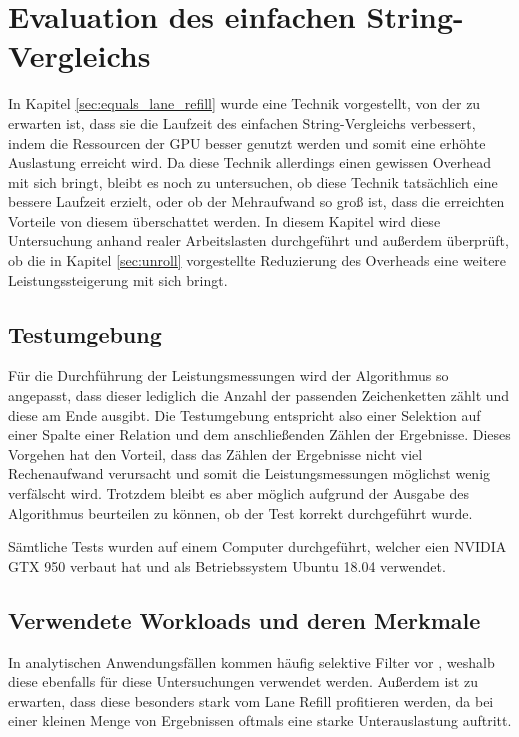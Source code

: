 \chapter{Evaluation des einfachen String-Vergleichs}
\label{sec:equals_evaluation}

In Kapitel \ref{sec:equals_lane_refill} wurde eine Technik vorgestellt, von der zu erwarten ist, dass sie die Laufzeit des einfachen String-Vergleichs verbessert, indem die Ressourcen der GPU besser genutzt werden und somit eine erhöhte Auslastung erreicht wird.
Da diese Technik allerdings einen gewissen Overhead mit sich bringt, bleibt es noch zu untersuchen, ob diese Technik tatsächlich eine bessere Laufzeit erzielt, oder ob der Mehraufwand so groß ist, dass die erreichten Vorteile von diesem überschattet werden.
In diesem Kapitel wird diese Untersuchung anhand realer Arbeitslasten durchgeführt und außerdem überprüft, ob die in Kapitel \ref{sec:unroll} vorgestellte Reduzierung des Overheads eine weitere Leistungssteigerung mit sich bringt.

\section{Testumgebung}

Für die Durchführung der Leistungsmessungen wird der Algorithmus so angepasst, dass dieser lediglich die Anzahl der passenden Zeichenketten zählt und diese am Ende ausgibt.
Die Testumgebung entspricht also einer Selektion auf einer Spalte einer Relation und dem anschließenden Zählen der Ergebnisse.
Dieses Vorgehen hat den Vorteil, dass das Zählen der Ergebnisse nicht viel Rechenaufwand verursacht und somit die Leistungsmessungen möglichst wenig verfälscht wird.
Trotzdem bleibt es aber möglich aufgrund der Ausgabe des Algorithmus beurteilen zu können, ob der Test korrekt durchgeführt wurde.

Sämtliche Tests wurden auf einem Computer durchgeführt, welcher eien NVIDIA GTX 950 verbaut hat und als Betriebssystem Ubuntu 18.04 verwendet.

\section{Verwendete Workloads und deren Merkmale}
\label{sec:equals_evaluation_workloads}

In analytischen Anwendungsfällen kommen häufig selektive Filter vor \cite{Boncz2013}, weshalb diese ebenfalls für diese Untersuchungen verwendet werden.
Außerdem ist zu erwarten, dass diese besonders stark vom Lane Refill profitieren werden, da bei einer kleinen Menge von Ergebnissen oftmals eine starke Unterauslastung auftritt.

